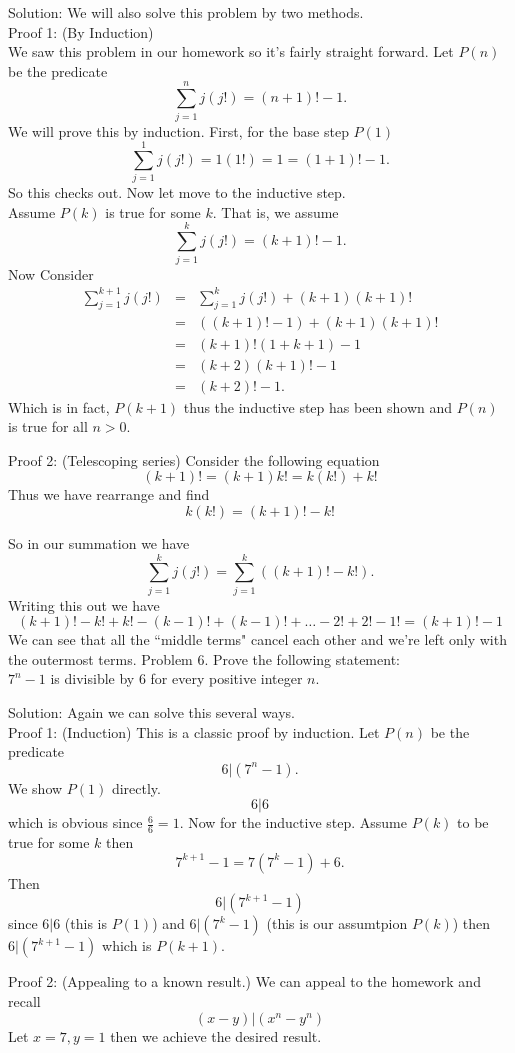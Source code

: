\documentclass[16 pt]{amsart}
\theoremstyle{definition}
\theoremstyle{remark}
\numberwithin{equation}{subsection}
\begin{document}
Solution: We will also solve this problem by two methods.\\
Proof 1: (By Induction)\\
We saw this problem in our homework so it's fairly straight forward.  Let $P(n)$ be the predicate 
\[
\sum_{j=1}^{n} j(j!) = (n+1)!-1.
\]
We will prove this by induction.  First, for the base step $P(1)$
\[
\sum_{j=1}^{1} j(j!) = 1(1!) = 1= (1+1)!-1.
\]
So this checks out.  Now let move to the inductive step.\\
Assume $P(k)$ is true for some $k$.  That is, we assume
\[
\sum_{j=1}^{k} j(j!) = (k+1)!-1.
\]
Now Consider
\begin{eqnarray*}
\sum_{j=1}^{k+1} j(j!) &=& \sum_{j=1}^{k} j(j!) + (k+1)(k+1)!\\
&=& ((k+1)!-1) + (k+1)(k+1)!\\
&=& (k+1)!(1+k+1) - 1\\
&=& (k+2)(k+1)! - 1\\
&=& (k+2)!-1.
\end{eqnarray*}
Which is in fact, $P(k+1)$ thus the inductive step has been shown and $P(n)$ is true for all $n>0$.
\newpage

Proof 2: (Telescoping series)
Consider the following equation
\[
(k+1)! = (k+1)k! = k(k!) + k!
\]
Thus we have rearrange and find
\[
k(k!) = (k+1)!-k!
\]

So in our summation we have
\[
\sum_{j=1}^{k} j(j!)= \sum_{j=1}^{k}((k+1)!-k!). 
\]
Writing this out we have
\[
(k+1)!-k!+k!-(k-1)!+(k-1)!+\dots - 2! + 2! - 1! = (k+1)!-1
\]
We can see that all the ``middle terms" cancel each other and we're left only with the outermost terms.
\newpage
Problem 6.
Prove the following statement:\\
$7^n-1$ is divisible by 6 for every positive integer $n$.

Solution:  Again we can solve this several ways.\\
Proof 1: (Induction) This is a classic proof by induction. Let $P(n)$ be the predicate
\[
6| (7^n-1).
\]
We show $P(1)$ directly.
\[
6|6
\]
which is obvious since $\frac{6}{6}=1$.
Now for the inductive step.
Assume $P(k)$ to be true for some $k$ then
\[
7^{k+1}-1 = 7(7^k-1)+6.
\]
Then 
\[
6|(7^{k+1}-1) 
\]
since $6|6$ (this is $P(1)$) and $6|(7^k-1)$ (this is our assumtpion $P(k)$) then $6|(7^{k+1}-1)$ which is $P(k+1)$.
\vspace{1in}

Proof 2: (Appealing to a known result.)
We can appeal to the homework and recall
\[
(x-y)|(x^n-y^n)
\]
Let $x=7,y=1$ then we achieve the desired result.
\end{document}
